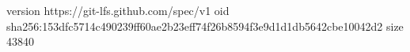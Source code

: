 version https://git-lfs.github.com/spec/v1
oid sha256:153dfc5714c490239ff60ae2b23eff74f26b8594f3e9d1d1db5642cbe10042d2
size 43840
